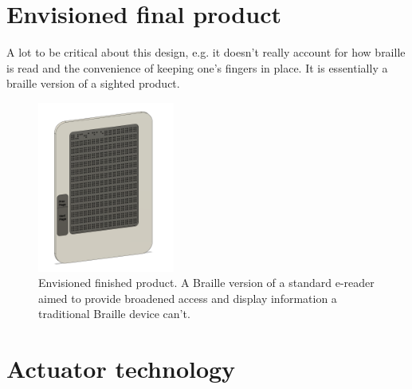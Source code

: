 \section{Envisioned final product}
A lot to be critical about this design, e.g. it doesn't really account for how braille is read and the convenience of keeping one's fingers in place. It is essentially a braille version of a sighted product.
\begin{figure}[h]
\centering
    \includegraphics[width=0.4\textwidth]{figures/e-reader.png}
\caption[Envisioned finished product]{Envisioned finished product. A Braille version of a standard e-reader aimed to provide broadened access and display information a traditional Braille device can't.}
\label{fig:e-reader.png}
\end{figure}


\section{Actuator technology}
